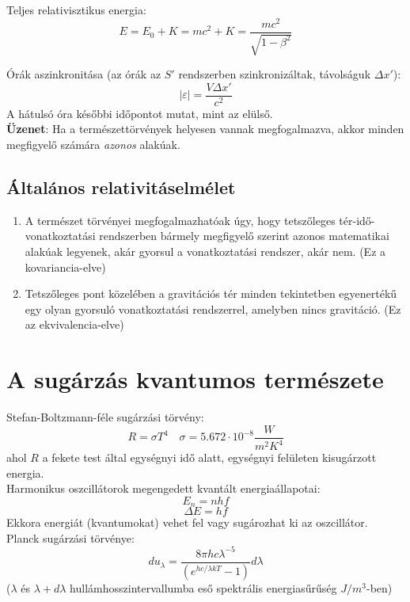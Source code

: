 \documentclass[12pt,a4paper,twocolumn]{article}
\begin{document}
  Teljes relativisztikus energia: 
  \[E = E_0 + K = mc^2 + K = \frac{mc^2}{\sqrt{1-\beta^2}}\]

  Órák aszinkronitása (az órák az $S'$ rendszerben szinkronizáltak, távolságuk $\Delta x'$):
  \[|\varepsilon| = \frac{V \Delta x'}{c^2}\]
  A hátulsó óra későbbi időpontot mutat, mint az elülső.\\

  \textbf{Üzenet}: Ha a természettörvények helyesen vannak megfogalmazva, akkor minden
  megfigyelő számára \textit{azonos} alakúak.

  \subsection{Általános relativitáselmélet}

  \begin{enumerate}
    \item A természet törvényei megfogalmazhatóak úgy, hogy tetszőleges tér-idő-vonatkoztatási
    rendszerben bármely megfigyelő szerint azonos matematikai alakúak legyenek, akár
    gyorsul a vonatkoztatási rendszer, akár nem. (Ez a kovariancia-elve)

    \item Tetszőleges pont közelében a gravitációs tér minden tekintetben egyenertékű egy olyan
    gyorsuló vonatkoztatási rendszerrel, amelyben nincs gravitáció. (Ez az ekvivalencia-elve)

  \end{enumerate}

  \section{A sugárzás kvantumos természete}

  Stefan-Boltzmann-féle sugárzási törvény:
  \[\boxed{R = \sigma T^4} \quad \sigma = 5.672\cdot 10^{-8} \frac{W}{m^2 K^4}\]
  ahol $R$ a fekete test által egységnyi idő alatt, egységnyi felületen kisugárzott energia.\\

  Harmonikus oszcillátorok megengedett kvantált energiaállapotai:
  \[E_n = nhf\]
  \[\Delta E = hf\]
  Ekkora energiát (kvantumokat) vehet fel vagy sugározhat ki az oszcillátor.\\

  Planck sugárzási törvénye:
  \[du_\lambda = \frac{8\pi h c \lambda^{-5}}{\left(e^{hc/\lambda kT}-1\right)}d\lambda\]
  ($\lambda$ és $\lambda + d\lambda$ hullámhosszintervallumba eső spektrális energiasűrűség $J/m^3$-ben)
\end{document}
